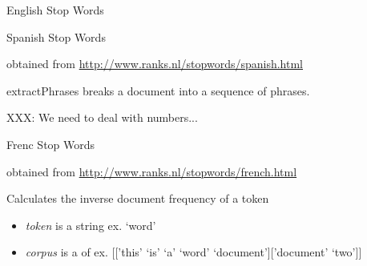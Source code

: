\documentclass[letterpaper,10pt,english]{sphinxmanual}
\begin{document}
\begin{fulllineitems}
\label{theseus:theseus.processor.theseus.enClean}
English Stop Words

\end{fulllineitems}


\begin{fulllineitems}
\label{theseus:theseus.processor.theseus.esClean}
Spanish Stop Words

obtained from \href{http://www.ranks.nl/stopwords/spanish.html}{http://www.ranks.nl/stopwords/spanish.html}

\end{fulllineitems}


\begin{fulllineitems}
\label{theseus:theseus.processor.theseus.extractPhrases}
extractPhrases breaks a document into a sequence of phrases.

XXX: We need to deal with numbers...

\end{fulllineitems}


\begin{fulllineitems}
\label{theseus:theseus.processor.theseus.frClean}
Frenc Stop Words

obtained from \href{http://www.ranks.nl/stopwords/french.html}{http://www.ranks.nl/stopwords/french.html}

\end{fulllineitems}


\begin{fulllineitems}
\label{theseus:theseus.processor.theseus.idf}
Calculates the inverse document frequency of a token
\begin{itemize}
\item {} 
\emph{token} is a string               ex. `word'

\item {} 
\emph{corpus} is a  of     ex. {[}{[}'this' `is' `a' `word' `document'{]}{[}'document' `two'{]}{]}

\end{itemize}

\end{fulllineitems}
\end{document}
